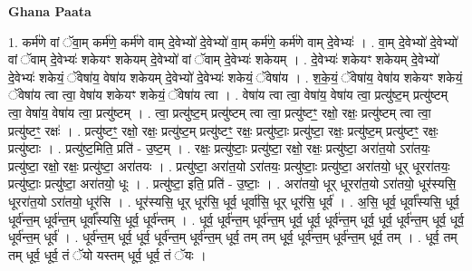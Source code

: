 \documentclass[17pt]{extarticle}
\begin{document}
\textbf{Ghana Paata } \newline

1. कर्म॑णे वां ॅवा॒म् कर्म॑णे॒ कर्म॑णे वाम् दे॒वेभ्यो॑ दे॒वेभ्यो॑ वा॒म् कर्म॑णे॒ कर्म॑णे वाम् दे॒वेभ्यः॑ । . वा॒म् दे॒वेभ्यो॑ दे॒वेभ्यो॑ वां ॅवाम् दे॒वेभ्यः॑ शकेयꣳ शकेयम् दे॒वेभ्यो॑ वां ॅवाम् दे॒वेभ्यः॑ शकेयम् । . दे॒वेभ्यः॑ शकेयꣳ शकेयम् दे॒वेभ्यो॑ दे॒वेभ्यः॑ शकेयं॒ ॅवेषा॑य॒ वेषा॑य शकेयम् दे॒वेभ्यो॑ दे॒वेभ्यः॑ शकेयं॒ ॅवेषा॑य । . श॒के॒यं॒ ॅवेषा॑य॒ वेषा॑य शकेयꣳ शकेयं॒ ॅवेषा॑य त्वा त्वा॒ वेषा॑य शकेयꣳ शकेयं॒ ॅवेषा॑य त्वा । . वेषा॑य त्वा त्वा॒ वेषा॑य॒ वेषा॑य त्वा॒ प्रत्यु॑ष्ट॒म् प्रत्यु॑ष्टम् त्वा॒ वेषा॑य॒ वेषा॑य त्वा॒ प्रत्यु॑ष्टम् । . त्वा॒ प्रत्यु॑ष्ट॒म् प्रत्यु॑ष्टम् त्वा त्वा॒ प्रत्यु॑ष्टꣳ॒॒ रक्षो॒ रक्षः॒ प्रत्यु॑ष्टम् त्वा त्वा॒ प्रत्यु॑ष्टꣳ॒॒ रक्षः॑ । . प्रत्यु॑ष्टꣳ॒॒ रक्षो॒ रक्षः॒ प्रत्यु॑ष्ट॒म् प्रत्यु॑ष्टꣳ॒॒ रक्षः॒ प्रत्यु॑ष्टाः॒ प्रत्यु॑ष्टा॒ रक्षः॒ प्रत्यु॑ष्ट॒म् प्रत्यु॑ष्टꣳ॒॒ रक्षः॒ प्रत्यु॑ष्टाः । . प्रत्यु॑ष्ट॒मिति॒ प्रति॑ - उ॒ष्ट॒म् । . रक्षः॒ प्रत्यु॑ष्टाः॒ प्रत्यु॑ष्टा॒ रक्षो॒ रक्षः॒ प्रत्यु॑ष्टा॒ अरा॑त॒यो ऽरा॑तयः॒ प्रत्यु॑ष्टा॒ रक्षो॒ रक्षः॒ प्रत्यु॑ष्टा॒ अरा॑तयः । . प्रत्यु॑ष्टा॒ अरा॑त॒यो ऽरा॑तयः॒ प्रत्यु॑ष्टाः॒ प्रत्यु॑ष्टा॒ अरा॑तयो॒ धूर् धूररा॑तयः॒ प्रत्यु॑ष्टाः॒ प्रत्यु॑ष्टा॒ अरा॑तयो॒ धूः । . प्रत्यु॑ष्टा॒ इति॒ प्रति॑ - उ॒ष्टाः॒ । . अरा॑तयो॒ धूर् धूररा॑त॒यो ऽरा॑तयो॒ धूर॑स्यसि॒ धूररा॑त॒यो ऽरा॑तयो॒ धूर॑सि । . धूर॑स्यसि॒ धूर् धूर॑सि॒ धूर्व॒ धूर्वा॑सि॒ धूर् धूर॑सि॒ धूर्व॑ । . अ॒सि॒ धूर्व॒ धूर्वा᳚स्यसि॒ धूर्व॒ धूर्व॑न्त॒म् धूर्व॑न्त॒म् धूर्वा᳚स्यसि॒ धूर्व॒ धूर्व॑न्तम् । . धूर्व॒ धूर्व॑न्त॒म् धूर्व॑न्त॒म् धूर्व॒ धूर्व॒ धूर्व॑न्त॒म् धूर्व॒ धूर्व॒ धूर्व॑न्त॒म् धूर्व॒ धूर्व॒ धूर्व॑न्त॒म् धूर्व॑ । . धूर्व॑न्त॒म् धूर्व॒ धूर्व॒ धूर्व॑न्त॒म् धूर्व॑न्त॒म् धूर्व॒ तम् तम् धूर्व॒ धूर्व॑न्त॒म् धूर्व॑न्त॒म् धूर्व॒ तम् । . धूर्व॒ तम् तम् धूर्व॒ धूर्व॒ तं ॅयो यस्तम् धूर्व॒ धूर्व॒ तं ॅयः । \newline
\end{document}
